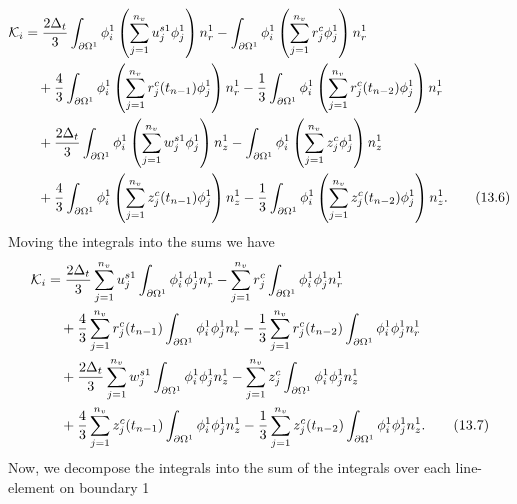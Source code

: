\documentclass{article}
\begin{document}
\begin{align}
\mathcal{K}_i &= \frac{2\Delta_t}{3} \int_{\partial \Omega^{1}} \phi_i^1 \left( \sum_{j=1}^{n_v} u_j^{s1} \phi_j^1 \right) n_r^1 - \int_{\partial \Omega^{1}} \phi_i^1 \left( \sum_{j=1}^{n_v} r_j^c \phi_j^1 \right) n_r^1 \nonumber\\
&\quad + \frac{4}{3} \int_{\partial \Omega^{1}} \phi_i^1 \left( \sum_{j=1}^{n_v} r_j^c(t_{n-1}) \phi_j^1 \right) n_r^1 - \frac{1}{3} \int_{\partial \Omega^{1}} \phi_i^1 \left( \sum_{j=1}^{n_v} r_j^c(t_{n-2}) \phi_j^1 \right) n_r^1 \nonumber\\
&\quad + \frac{2\Delta_t}{3} \int_{\partial \Omega^{1}} \phi_i^1 \left( \sum_{j=1}^{n_v} w_j^{s1} \phi_j^1 \right) n_z^1 - \int_{\partial \Omega^{1}} \phi_i^1 \left( \sum_{j=1}^{n_v} z_j^c \phi_j^1 \right) n_z^1 \nonumber\\
&\quad + \frac{4}{3} \int_{\partial \Omega^{1}} \phi_i^1 \left( \sum_{j=1}^{n_v} z_j^c(t_{n-1}) \phi_j^1 \right) n_z^1 - \frac{1}{3} \int_{\partial \Omega^{1}} \phi_i^1 \left( \sum_{j=1}^{n_v} z_j^c(t_{n-2}) \phi_j^1 \right) n_z^1. \tag{13.6}
\end{align}
Moving the integrals into the sums we have
\begin{align}
\mathcal{K}_i &= \frac{2\Delta_t}{3} \sum_{j=1}^{n_v} u_j^{s1} \int_{\partial \Omega^{1}} \phi_i^1 \phi_j^1 n_r^1 - \sum_{j=1}^{n_v} r_j^c \int_{\partial \Omega^{1}} \phi_i^1 \phi_j^1 n_r^1 \nonumber\\
&\quad + \frac{4}{3} \sum_{j=1}^{n_v} r_j^c(t_{n-1}) \int_{\partial \Omega^{1}} \phi_i^1 \phi_j^1 n_r^1 - \frac{1}{3} \sum_{j=1}^{n_v} r_j^c(t_{n-2}) \int_{\partial \Omega^{1}} \phi_i^1 \phi_j^1 n_r^1 \nonumber\\
&\quad + \frac{2\Delta_t}{3} \sum_{j=1}^{n_v} w_j^{s1} \int_{\partial \Omega^{1}} \phi_i^1 \phi_j^1 n_z^1 - \sum_{j=1}^{n_v} z_j^c \int_{\partial \Omega^{1}} \phi_i^1 \phi_j^1 n_z^1 \nonumber\\
&\quad + \frac{4}{3} \sum_{j=1}^{n_v} z_j^c(t_{n-1}) \int_{\partial \Omega^{1}} \phi_i^1 \phi_j^1 n_z^1 - \frac{1}{3} \sum_{j=1}^{n_v} z_j^c(t_{n-2}) \int_{\partial \Omega^{1}} \phi_i^1 \phi_j^1 n_z^1. \tag{13.7}
\end{align}
Now, we decompose the integrals into the sum of the integrals over each line-element on boundary 1
\end{document}
